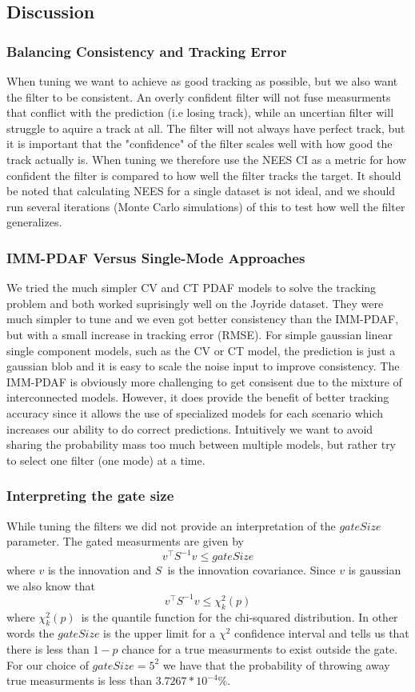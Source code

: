 \subsection{Discussion}
\subsubsection{Balancing Consistency and Tracking Error}
When tuning we want to achieve as good tracking as possible, but we also want the filter to be consistent. An overly confident filter will not fuse measurments that conflict with the prediction (i.e losing track), while an uncertian filter will struggle to aquire a track at all. The filter will not always have perfect track, but it is important that the "confidence" of the filter scales well with how good the track actually is.
When tuning we therefore use the NEES CI as a metric for how confident the filter is compared to how well the filter tracks the target. It should be noted that calculating NEES for a single dataset is not ideal, and we should run several iterations (Monte Carlo simulations) of this to test how well the filter generalizes.

\subsubsection{IMM-PDAF Versus Single-Mode Approaches} \label{whyimmpdaf}
We tried the much simpler CV and CT PDAF models to solve the tracking problem and both worked suprisingly well on the Joyride dataset. They were much simpler to tune and we even got better consistency than the IMM-PDAF, but with a small increase in tracking error (RMSE). For simple gaussian linear single component models, such as the CV or CT model, the prediction is just a gaussian blob and it is easy to scale the noise input to improve consistency. The IMM-PDAF is obviously more challenging to get consisent due to the mixture of interconnected models. However, it does provide the benefit of better tracking accuracy since it allows the use of specialized models for each scenario which increases our ability to do correct predictions. Intuitively we want to avoid sharing the probability mass too much between multiple models, but rather try to select one filter (one mode) at a time.

\subsubsection{Interpreting the gate size} \label{sec:imm-pdaf-gate-size}
While tuning the filters we did not provide an interpretation of the $gateSize$ parameter. The gated measurments are given by 
$$v^\intercal S^{-1} v \leq gateSize$$ where $v$ is the innovation and $S$ is the innovation covariance.
Since $v$ is gaussian we also know that 
$$v^\intercal S^{-1} v \leq \chi_k^2(p)$$ where $\chi_k^2(p)$ is the quantile function for the chi-squared distribution\cite{wiki:multivariate_normal}. In other words the $gateSize$ is the upper limit for a $\chi^2$ confidence interval and tells us that there is less than $1-p$ chance for a true measurments to exist outside the gate. For our choice of $gateSize = 5^2$ we have that the probability of throwing away true measurments is less than $3.7267*10^{-4}\%$.


